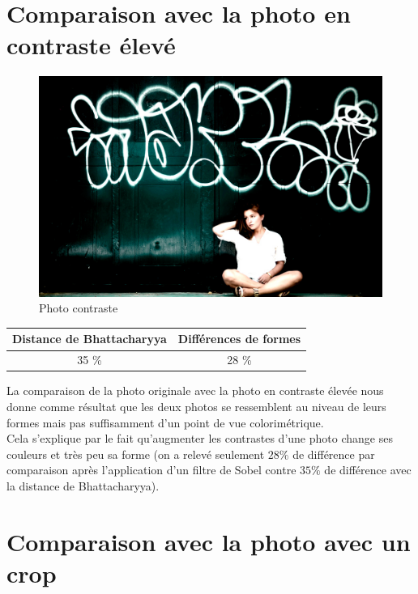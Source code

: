 \documentclass[]{article}
\begin{document}
\newpage

\section{Comparaison avec la photo en contraste
élevé}\label{comparaison-avec-la-photo-en-contraste-uxe9levuxe9}

\begin{figure}[htbp]
\centering
\includegraphics{photos/contraste.jpg}
\caption{Photo contraste}
\end{figure}

\begin{center}
\begin{tabular}{|c|c|}
  \hline
  Distance de Bhattacharyya & Différences de formes \\
  \hline
  35 \% & 28 \% \\
  \hline
\end{tabular}
\end{center}

La comparaison de la photo originale avec la photo en
contraste élevée nous donne comme résultat que les deux photos se
ressemblent au niveau de leurs formes mais pas suffisamment d'un point
de vue colorimétrique. \\
Cela s'explique par le fait qu'augmenter les contrastes d'une photo change ses
couleurs et très peu sa forme (on a relevé seulement $28 \%$ de différence par
comparaison après l'application d'un filtre de Sobel contre $35 \%$ de différence
avec la distance de Bhattacharyya).

\newpage

\section{Comparaison avec la photo avec un
crop}\label{comparaison-avec-la-photo-avec-un-crop}
\end{document}
